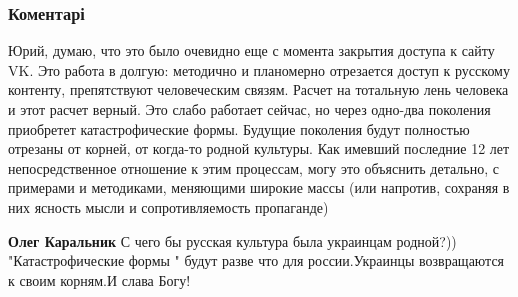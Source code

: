  
 
 
 
 
\subsubsection{Коментарі}
\label{sec:03_09_2021.fb.molchanov_jurij.1.apple_google_vstrechi.cmt}

\begin{itemize}
 

Юрий, думаю, что это было очевидно еще с момента закрытия доступа к сайту VK.
Это работа в долгую: методично и планомерно отрезается доступ к русскому
контенту, препятствуют человеческим связям. Расчет на тотальную лень человека и
этот расчет верный. Это слабо работает сейчас, но через одно-два поколения
приобретет катастрофические формы. Будущие поколения будут полностью отрезаны
от корней, от когда-то родной культуры. Как имевший последние 12 лет
непосредственное отношение к этим процессам, могу это объяснить детально, с
примерами и методиками, меняющими широкие массы (или напротив, сохраняя в них
ясность мысли и сопротивляемость пропаганде)

\begin{itemize}
 
\textbf{Олег Каральник} С чего бы русская культура была украинцам родной?)) "Катастрофические формы " будут разве что для россии.Украинцы возвращаются к своим корням.И слава Богу!
\end{itemize}

 


\end{itemize}
